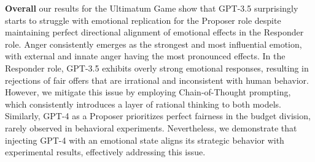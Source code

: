 \documentclass{article}
\begin{document}
\textbf{Overall} our results for the Ultimatum Game show that GPT-3.5 surprisingly starts to struggle with emotional replication for the Proposer role despite maintaining perfect directional alignment of emotional effects in the Responder role. Anger consistently emerges as the strongest and most influential emotion, with external and innate anger having the most pronounced effects. In the Responder role, GPT-3.5 exhibits overly strong emotional responses, resulting in rejections of fair offers that are irrational and inconsistent with human behavior. However, we mitigate this issue by employing Chain-of-Thought prompting, which consistently introduces a layer of rational thinking to both models. Similarly, GPT-4 as a Proposer prioritizes perfect fairness in the budget division, rarely observed in behavioral experiments. Nevertheless, we demonstrate that injecting GPT-4 with an emotional state aligns its strategic behavior with experimental results, effectively addressing this issue.


\end{document}

